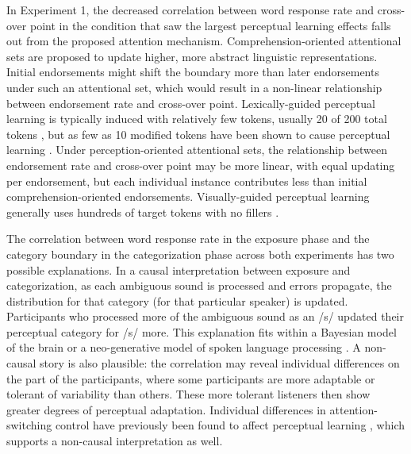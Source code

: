 In Experiment 1, the decreased correlation between word response rate and cross-over point in the condition that saw the largest perceptual learning effects falls out from the proposed attention mechanism.
Comprehension-oriented attentional sets are proposed to update higher, more abstract linguistic representations.
Initial endorsements might shift the boundary more than later endorsements under such an attentional set, which would result in a non-linear relationship between endorsement rate and cross-over point.
Lexically-guided perceptual learning is typically induced with relatively few tokens, usually 20 of 200 total tokens \citep{Norris2003, Reinisch2013}, but as few as 10 modified tokens have been shown to cause perceptual learning \citep{Kraljic2008}.
Under perception-oriented attentional sets, the relationship between endorsement rate and cross-over point may be more linear, with equal updating per endorsement, but each individual instance contributes less than initial comprehension-oriented endorsements.
Visually-guided perceptual learning generally uses hundreds of target tokens with no fillers \citep{Vroomen2007, Reinisch2014}.

The correlation between word response rate in the exposure phase and the category boundary in the categorization phase across both experiments has two possible explanations. 
In a causal interpretation between exposure and categorization, as each ambiguous sound is processed and errors propagate, the distribution for that category (for that particular speaker) is updated.
Participants who processed more of the ambiguous sound as an /s/ updated their perceptual category for /s/ more. 
This explanation fits within a Bayesian model of the brain \citep{Clark2013} or a neo-generative model of spoken language processing \citep{Pierrehumbert2002}.  
A non-causal story is also plausible:  the correlation may reveal individual differences on the part of the participants, where some participants are more adaptable or tolerant of variability than others.
These more tolerant listeners then show greater degrees of perceptual adaptation. 
Individual differences in attention-switching control have previously been found to affect perceptual learning \citep{Scharenborg2014}, which supports a non-causal interpretation as well.

